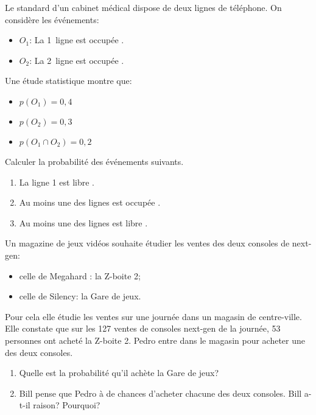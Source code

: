 \begin{exercice}
Le standard d'un cabinet médical dispose de deux lignes de téléphone. On considère les événements:
\begin{itemize}
\item$O_1$: \og La 1\ier\ ligne est occupée \fg.
\item $O_2$: \og La 2\ieme\ ligne est occupée \fg. 
\end{itemize}
Une étude statistique montre que:
\begin{itemize}
\item $p(O_1)=0,4$
\item $p(O_2)=0,3$
\item $p(O_1 \cap O_2)=0,2$
\end{itemize}
Calculer la probabilité des événements suivants.
\begin{enumerate}
\item \og La ligne 1 est libre \fg.
\item \og Au moins une des lignes est occupée \fg.
\item \og Au moins une des lignes est libre \fg. 
\end{enumerate}
\end{exercice}

\begin{exercice}
    Un magazine de jeux vidéos souhaite étudier les ventes des deux consoles 
de next-gen:
\begin{itemize}
\item celle de Megahard : la Z-boite 2;
\item celle de Silency: la Gare de jeux.
\end{itemize}
Pour cela elle étudie les ventes sur une journée dans un magasin de 
centre-ville. Elle constate que sur les 127 ventes de consoles next-gen de la journée, 53 
personnes ont acheté la Z-boite 2.
Pedro entre dans le magasin pour acheter une des deux consoles.
\begin{enumerate}
\item Quelle est la probabilité qu'il achète la Gare de jeux?
\item Bill  pense que Pedro à  de chances d'acheter chacune des deux consoles.
    Bill a-t-il raison? Pourquoi?
\end{enumerate} 
\end{exercice}

 
 

 
 
 
 
 
 
 





